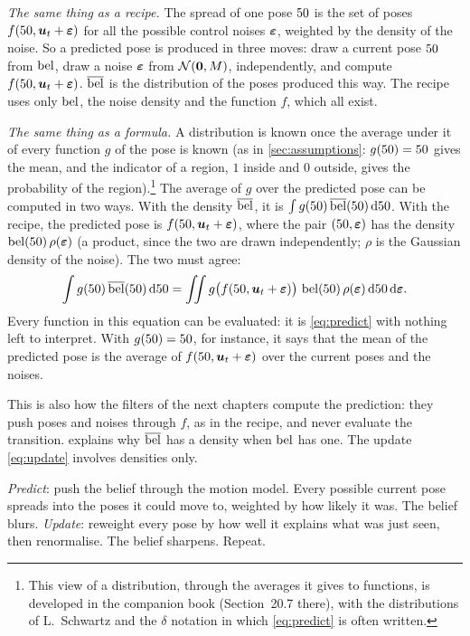 \emph{The same thing as a recipe.} The spread of one pose $50$ is the set
of poses $f(50,\bm{u}_t+\bm{\varepsilon})$ for all the possible control noises
$\bm{\varepsilon}$, weighted by the density of the noise. So a predicted pose is
produced in three moves: draw a current pose $50$ from $\operatorname{bel}$, draw a
noise $\bm{\varepsilon}$ from $\mathcal{N}(\bm{0},M)$, independently, and compute
$f(50,\bm{u}_t+\bm{\varepsilon})$. $\overline{\operatorname{bel}}$ is the distribution of the poses
produced this way. The recipe uses only $\operatorname{bel}$, the noise density and the
function $f$, which all exist.

\emph{The same thing as a formula.} A distribution is known once the
average under it of every function $g$ of the pose is known (as in
\cref{sec:assumptions}: $g(50)=50$ gives the mean, and the indicator of a
region, $1$ inside and $0$ outside, gives the probability of the region).\footnote{This
view of a distribution, through the averages it gives to functions, is
developed in the companion book (Section~20.7 there), with the
distributions of L.~Schwartz and the $\delta$ notation in which
\eqref{eq:predict} is often written.}
The average of $g$ over the predicted pose can be computed in two ways.
With the density $\overline{\operatorname{bel}}$, it is $\int g(50)\,\overline{\operatorname{bel}}(50)\,\mathrm d50$.
With the recipe, the predicted pose is $f(50,\bm{u}_t+\bm{\varepsilon})$, where the
pair $(50,\bm{\varepsilon})$ has the density $\operatorname{bel}(50)\,\rho(\bm{\varepsilon})$ (a
product, since the two are drawn independently; $\rho$ is the Gaussian
density of the noise). The two must agree:
\begin{equation}\label{eq:predictnoise}
  \int g(50)\,\overline{\operatorname{bel}}(50)\,\mathrm d50
  =\iint g\bigl(f(50,\bm{u}_t+\bm{\varepsilon})\bigr)\,\operatorname{bel}(50)\,\rho(\bm{\varepsilon})\,
  \mathrm d50\,\mathrm d\bm{\varepsilon} .
\end{equation}
Every function in this equation can be evaluated: it is \eqref{eq:predict}
with nothing left to interpret. With $g(50)=50$, for instance, it says
that the mean of the predicted pose is the average of
$f(50,\bm{u}_t+\bm{\varepsilon})$ over the current poses and the noises.

This is also how the filters of the next chapters compute the prediction:
they push poses and noises through $f$, as in the recipe, and never
evaluate the transition.  explains why $\overline{\operatorname{bel}}$ has a
density when $\operatorname{bel}$ has one. The update \eqref{eq:update} involves
densities only.

\begin{inwords}
\emph{Predict}: push the belief through the motion model. Every possible
current pose spreads into the poses it could move to, weighted by how
likely it was. The belief blurs. \emph{Update}: reweight every pose by how
well it explains what was just seen, then renormalise. The belief
sharpens. Repeat.
\end{inwords}

